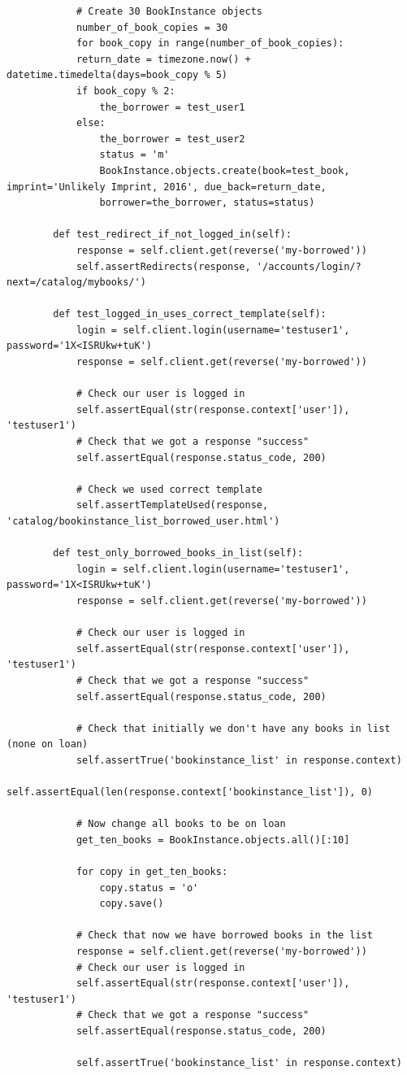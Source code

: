 \documentclass[12pt, a4paper]{report}
\begin{document}
\begin{lstlisting}
			# Create 30 BookInstance objects
			number_of_book_copies = 30
			for book_copy in range(number_of_book_copies):
			return_date = timezone.now() + datetime.timedelta(days=book_copy % 5)
			if book_copy % 2:
				the_borrower = test_user1
			else:
				the_borrower = test_user2
				status = 'm'
				BookInstance.objects.create(book=test_book, imprint='Unlikely Imprint, 2016', due_back=return_date,
				borrower=the_borrower, status=status)
	
		def test_redirect_if_not_logged_in(self):
			response = self.client.get(reverse('my-borrowed'))
			self.assertRedirects(response, '/accounts/login/?next=/catalog/mybooks/')
	
		def test_logged_in_uses_correct_template(self):
			login = self.client.login(username='testuser1', password='1X<ISRUkw+tuK')
			response = self.client.get(reverse('my-borrowed'))
	
			# Check our user is logged in
			self.assertEqual(str(response.context['user']), 'testuser1')
			# Check that we got a response "success"
			self.assertEqual(response.status_code, 200)
	
			# Check we used correct template
			self.assertTemplateUsed(response, 'catalog/bookinstance_list_borrowed_user.html')
	
		def test_only_borrowed_books_in_list(self):
			login = self.client.login(username='testuser1', password='1X<ISRUkw+tuK')
			response = self.client.get(reverse('my-borrowed'))
	
			# Check our user is logged in
			self.assertEqual(str(response.context['user']), 'testuser1')
			# Check that we got a response "success"
			self.assertEqual(response.status_code, 200)
	
			# Check that initially we don't have any books in list (none on loan)
			self.assertTrue('bookinstance_list' in response.context)
			self.assertEqual(len(response.context['bookinstance_list']), 0)
	
			# Now change all books to be on loan
			get_ten_books = BookInstance.objects.all()[:10]
	
			for copy in get_ten_books:
				copy.status = 'o'
				copy.save()
	
			# Check that now we have borrowed books in the list
			response = self.client.get(reverse('my-borrowed'))
			# Check our user is logged in
			self.assertEqual(str(response.context['user']), 'testuser1')
			# Check that we got a response "success"
			self.assertEqual(response.status_code, 200)
	
			self.assertTrue('bookinstance_list' in response.context)
	

\end{lstlisting}
\end{document}
